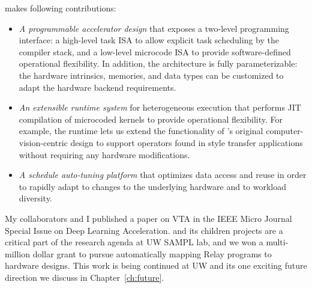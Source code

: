 \vta makes following contributions:

\begin{itemize}
    \item \emph{A programmable accelerator design} that exposes a two-level programming interface: a high-level task ISA to allow explicit task scheduling by the compiler stack, and a low-level microcode ISA to provide software-defined operational flexibility.
    In addition, the \vta architecture is fully parameterizable: the hardware intrinsics, memories, and data types can be customized to adapt the hardware backend requirements.
    \item \emph{An extensible runtime system} for heterogeneous execution that performs JIT compilation of microcoded kernels to provide operational flexibility. For example, the \vta runtime lets us extend the functionality of \vta's original computer-vision-centric design to support operators found in style transfer applications without requiring any hardware modifications.
    \item \emph{A schedule auto-tuning platform} that optimizes data access and reuse in order to rapidly adapt to changes to the underlying hardware and to workload diversity.
\end{itemize}

My collaborators and I published a paper on VTA in
  the IEEE Micro Journal Special Issue on Deep Learning Acceleration.
\vta and its children projects are a critical part of the research
  agenda at UW SAMPL lab, and we won a multi-million dollar grant to
  pursue automatically mapping Relay programs to hardware designs.
This work is being continued at UW and its one exciting future
  direction we discuss in Chapter~\ref{ch:future}.

